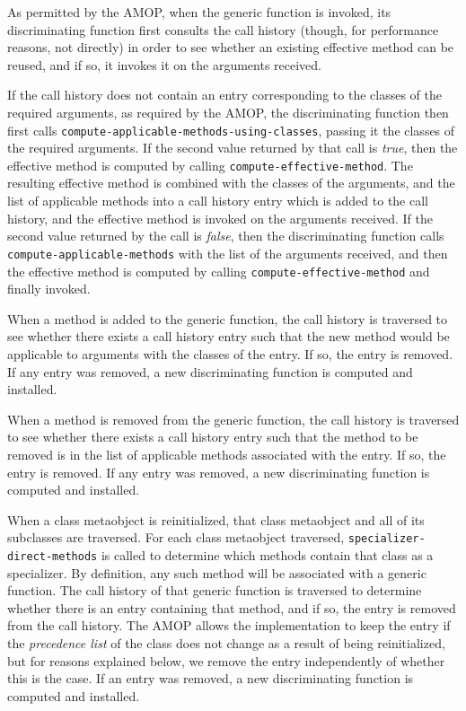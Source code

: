 As permitted by the AMOP, when the generic function is invoked, its
discriminating function first consults the call history (though, for
performance reasons, not directly) in order to see whether an existing
effective method can be reused, and if so, it invokes it on the
arguments received.

If the call history does not contain an entry corresponding to the
classes of the required arguments, as required by the AMOP, the
discriminating function then first calls
\texttt{compute-applicable-methods-using-classes}, passing it the
classes of the required arguments.  If the second value returned by
that call is \textit{true}, then the effective method is computed by
calling \texttt{compute-effective-method}.  The resulting effective
method is combined with the classes of the arguments, and the list of
applicable methods into a call history entry which is added to the
call history, and the effective method is invoked on the arguments
received.  If the second value returned by the call is \textit{false},
then the discriminating function calls
\texttt{compute-applicable-methods} with the list of the arguments
received, and then the effective method is computed by calling
\texttt{compute-effective-method} and finally invoked.

When a method is added to the generic function, the call history is
traversed to see whether there exists a call history entry such that
the new method would be applicable to arguments with the classes of
the entry.  If so, the entry is removed.  If any entry was removed, a
new discriminating function is computed and installed. 

When a method is removed from the generic function, the call history
is traversed to see whether there exists a call history entry such
that the method to be removed is in the list of applicable methods
associated with the entry.  If so, the entry is removed. If any entry
was removed, a new discriminating function is computed and installed.

When a class metaobject is reinitialized, that class metaobject and
all of its subclasses are traversed.  For each class metaobject
traversed, \texttt{specializer-direct-methods} is called to determine
which methods contain that class as a specializer.  By definition, any
such method will be associated with a generic function.  The call
history of that generic function is traversed to determine whether
there is an entry containing that method, and if so, the entry is
removed from the call history.  The AMOP allows the implementation to
keep the entry if the \emph{precedence list} of the class does not
change as a result of being reinitialized, but for reasons explained
below, we remove the entry independently of whether this is the case.
If an entry was removed, a new discriminating function is computed and
installed.

